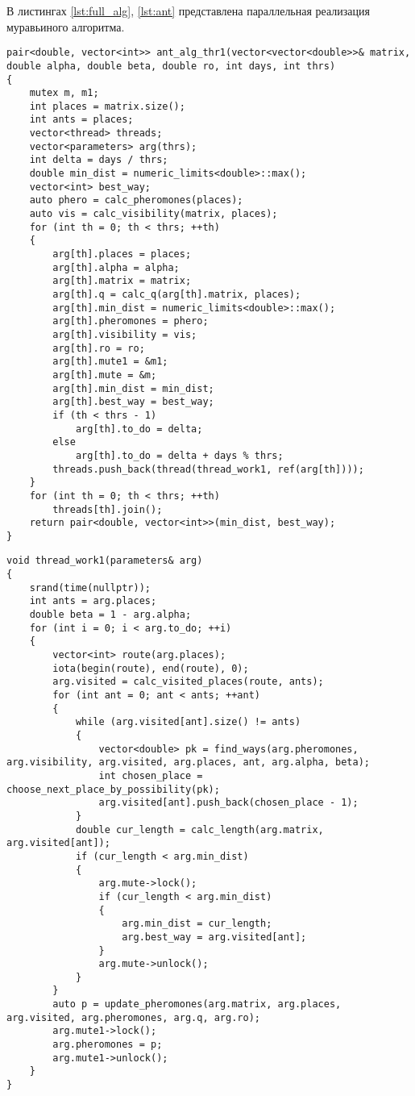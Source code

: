 \setcounter{chapter}{3}
\clearpage

В листингах \ref{lst:full_alg}, \ref{lst:ant} представлена параллельная реализация муравьиного алгоритма.

\setcounter{lstlisting}{7}
\begin{center}
	\begin{lstlisting}[label=lst:full_alg,caption=Параллельный муравьиный алгоритм (основной поток)]
pair<double, vector<int>> ant_alg_thr1(vector<vector<double>>& matrix, double alpha, double beta, double ro, int days, int thrs)
{
	mutex m, m1;
	int places = matrix.size();
	int ants = places;
	vector<thread> threads;
	vector<parameters> arg(thrs);
	int delta = days / thrs;
	double min_dist = numeric_limits<double>::max();
	vector<int> best_way;
	auto phero = calc_pheromones(places);
	auto vis = calc_visibility(matrix, places);
	for (int th = 0; th < thrs; ++th)
	{
		arg[th].places = places;
		arg[th].alpha = alpha;
		arg[th].matrix = matrix;
		arg[th].q = calc_q(arg[th].matrix, places);
		arg[th].min_dist = numeric_limits<double>::max();
		arg[th].pheromones = phero;
		arg[th].visibility = vis;
		arg[th].ro = ro;
		arg[th].mute1 = &m1;
		arg[th].mute = &m;
		arg[th].min_dist = min_dist;
		arg[th].best_way = best_way;
		if (th < thrs - 1)
			arg[th].to_do = delta;
		else
			arg[th].to_do = delta + days % thrs;
		threads.push_back(thread(thread_work1, ref(arg[th])));
	}
	for (int th = 0; th < thrs; ++th)
		threads[th].join();
	return pair<double, vector<int>>(min_dist, best_way);
}
	\end{lstlisting}
\end{center}
\clearpage


\begin{center}
	\begin{lstlisting}[label=lst:ant,caption=Параллельный муравьиный алгоритм (вспомогательный поток)]
void thread_work1(parameters& arg)
{
	srand(time(nullptr));
	int ants = arg.places;
	double beta = 1 - arg.alpha;
	for (int i = 0; i < arg.to_do; ++i)
	{
		vector<int> route(arg.places);
		iota(begin(route), end(route), 0);
		arg.visited = calc_visited_places(route, ants);
		for (int ant = 0; ant < ants; ++ant)
		{
			while (arg.visited[ant].size() != ants)
			{
				vector<double> pk = find_ways(arg.pheromones, arg.visibility, arg.visited, arg.places, ant, arg.alpha, beta);
				int chosen_place = choose_next_place_by_possibility(pk);
				arg.visited[ant].push_back(chosen_place - 1);
			}
			double cur_length = calc_length(arg.matrix, arg.visited[ant]);
			if (cur_length < arg.min_dist)
			{
				arg.mute->lock();
				if (cur_length < arg.min_dist)
				{
					arg.min_dist = cur_length;
					arg.best_way = arg.visited[ant];
				}
				arg.mute->unlock();
			}
		}
		auto p = update_pheromones(arg.matrix, arg.places, arg.visited, arg.pheromones, arg.q, arg.ro);
		arg.mute1->lock();
		arg.pheromones = p;
		arg.mute1->unlock();
	}
}
		\end{lstlisting}
	\clearpage

\end{center}
